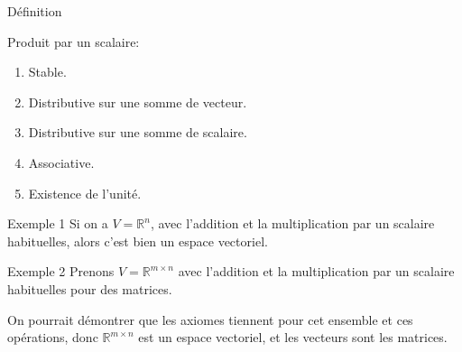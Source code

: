 \documentclass[a4paper]{article}
\begin{document}
\begin{parag}{Définition}
\begin{center}
\begin{minipage}[t]{0.45\textwidth}
    \end{minipage}
    \hfill
    \begin{minipage}[t]{0.45\textwidth}\vspace{0pt}
    Produit par un scalaire:
    \begin{enumerate}
        \item Stable.
        \item Distributive sur une somme de vecteur.
        \item Distributive sur une somme de scalaire.
        \item Associative.
        \item Existence de l'unité.
    \end{enumerate}

    \end{minipage}
    \end{center}
\end{parag}

\begin{parag}{Exemple 1}
    Si on a $V = \mathbb{R}^{n}$, avec l'addition et la multiplication par un scalaire habituelles, alors c'est bien un espace vectoriel.
\end{parag}

\begin{parag}{Exemple 2}
    Prenons $V = \mathbb{R}^{m \times n}$ avec l'addition et la multiplication par un scalaire habituelles pour des matrices.

    On pourrait démontrer que les axiomes tiennent pour cet ensemble et ces opérations, donc $\mathbb{R}^{m \times n}$ est un espace vectoriel, et les vecteurs sont les matrices.
\end{parag}
\end{document}
